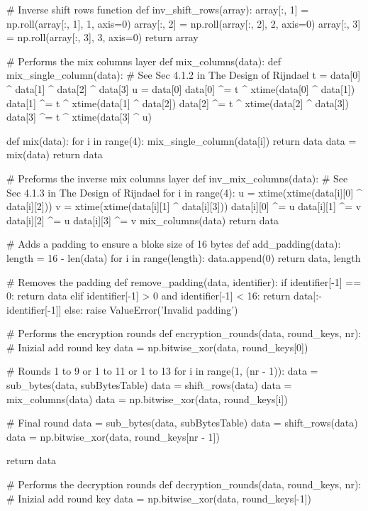 \begin{python}
# Inverse shift rows function
def inv_shift_rows(array):
    array[:, 1] = np.roll(array[:, 1], 1, axis=0)
    array[:, 2] = np.roll(array[:, 2], 2, axis=0)
    array[:, 3] = np.roll(array[:, 3], 3, axis=0)
    return array


# Performs the mix columns layer
def mix_columns(data):
    def mix_single_column(data):
        # See Sec 4.1.2 in The Design of Rijndael
        t = data[0] ^ data[1] ^ data[2] ^ data[3]
        u = data[0]
        data[0] ^= t ^ xtime(data[0] ^ data[1])
        data[1] ^= t ^ xtime(data[1] ^ data[2])
        data[2] ^= t ^ xtime(data[2] ^ data[3])
        data[3] ^= t ^ xtime(data[3] ^ u)

    def mix(data):
        for i in range(4):
            mix_single_column(data[i])
        return data
    data = mix(data)
    return data


# Preforms the inverse mix columns layer
def inv_mix_columns(data):
    # See Sec 4.1.3 in The Design of Rijndael
    for i in range(4):
        u = xtime(xtime(data[i][0] ^ data[i][2]))
        v = xtime(xtime(data[i][1] ^ data[i][3]))
        data[i][0] ^= u
        data[i][1] ^= v
        data[i][2] ^= u
        data[i][3] ^= v
    mix_columns(data)
    return data


# Adds a padding to ensure a bloke size of 16 bytes
def add_padding(data):
    length = 16 - len(data)
    for i in range(length):
        data.append(0)
    return data, length


# Removes the padding
def remove_padding(data, identifier):
    if identifier[-1] == 0:
        return data
    elif identifier[-1] > 0 and identifier[-1] < 16:
        return data[:-identifier[-1]]
    else:
        raise ValueError('Invalid padding')


# Performs the encryption rounds
def encryption_rounds(data, round_keys, nr):
    # Inizial add round key
    data = np.bitwise_xor(data, round_keys[0])

    # Rounds 1 to 9 or 1 to 11 or 1 to 13
    for i in range(1, (nr - 1)):
        data = sub_bytes(data, subBytesTable)
        data = shift_rows(data)
        data = mix_columns(data)
        data = np.bitwise_xor(data, round_keys[i])

    # Final round
    data = sub_bytes(data, subBytesTable)
    data = shift_rows(data)
    data = np.bitwise_xor(data, round_keys[nr - 1])

    return data


# Performs the decryption rounds
def decryption_rounds(data, round_keys, nr):
    # Inizial add round key
    data = np.bitwise_xor(data, round_keys[-1])


\end{python}
